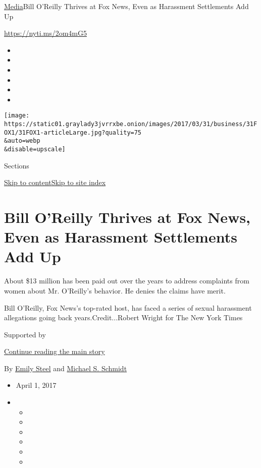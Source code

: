 \href{/section/business/media}{Media}\textbar{}Bill O'Reilly Thrives at
Fox News, Even as Harassment Settlements Add Up

\url{https://nyti.ms/2om4mG5}

\begin{itemize}
\item
\item
\item
\item
\item
\item
\end{itemize}

\texttt{[image: https://static01.graylady3jvrrxbe.onion/images/2017/03/31/business/31FOX1/31FOX1-articleLarge.jpg?quality=75\\\&auto=webp\\\&disable=upscale]}

Sections

\protect\hyperlink{site-content}{Skip to
content}\protect\hyperlink{site-index}{Skip to site index}

\hypertarget{bill-oreilly-thrives-at-fox-news-even-as-harassment-settlements-add-up}{%
\section{Bill O'Reilly Thrives at Fox News, Even as Harassment
Settlements Add
Up}\label{bill-oreilly-thrives-at-fox-news-even-as-harassment-settlements-add-up}}

About \$13 million has been paid out over the years to address
complaints from women about Mr. O'Reilly's behavior. He denies the
claims have merit.

Bill O'Reilly, Fox News's top-rated host, has faced a series of sexual
harassment allegations going back years.Credit...Robert Wright for The
New York Times

Supported by

\protect\hyperlink{after-sponsor}{Continue reading the main story}

By \href{https://www.nytimes3xbfgragh.onion/by/emily-steel}{Emily Steel}
and
\href{http://www.nytimes3xbfgragh.onion/by/michael-s-schmidt}{Michael S.
Schmidt}

\begin{itemize}
\item
  April 1, 2017
\item
  \begin{itemize}
  \item
  \item
  \item
  \item
  \item
  \item
  \end{itemize}
\end{itemize}

